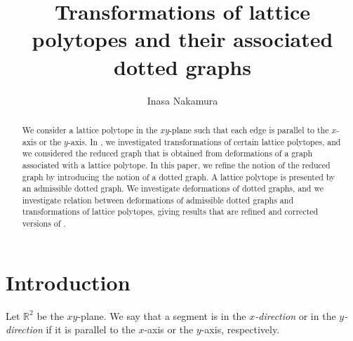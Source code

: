 \documentclass[a4paper,11pt]{amsart}
\title{Transformations of lattice polytopes and their associated dotted graphs}
\author{Inasa Nakamura}
\numberwithin{equation}{section}
\begin{document}
  
\begin{abstract}
We consider a lattice polytope in the $xy$-plane such that each edge is parallel to the $x$-axis or the $y$-axis. In \cite{N}, we investigated transformations of certain lattice polytopes, and we considered the reduced graph that is obtained from deformations of a graph  associated with a lattice polytope. In this paper, we refine the notion of the reduced graph by introducing the notion of a dotted graph. A lattice polytope is presented by an admissible dotted graph.
 We investigate deformations of dotted graphs, and we investigate relation between deformations of admissible dotted graphs and transformations of lattice polytopes, giving results that are refined and corrected versions of \cite[Lemma 6.2, Theorem 6.3]{N}. %
\end{abstract}
\maketitle

\section{Introduction}\label{sec1}


 
Let $\mathbb{R}^2$ be the $xy$-plane. We say that a segment is in the {\it $x$-direction} or in the {\it $y$-direction} if it is parallel to the $x$-axis or the $y$-axis, respectively.  
 
 
\end{document}
